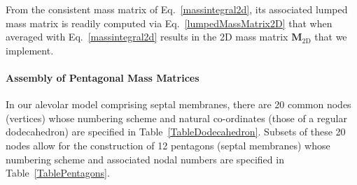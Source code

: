 From the consistent mass matrix of Eq.~\ref{massintegral2d}, its associated lumped mass matrix is readily computed via Eq.~\ref{lumpedMassMatrix2D} that when averaged with Eq.~\ref{massintegral2d} results in the 2D mass matrix $\mathbf{M}_{\mathrm{2D}}$ that we implement.

\paragraph{Assembly of Pentagonal Mass Matrices}

In our alevolar model comprising septal membranes, there are 20 common nodes (vertices) whose numbering scheme and natural co-ordinates (those of a regular dodecahedron) are specified in Table~\ref{TableDodecahedron}.  Subsets of these 20 nodes allow for the construction of 12 pentagons (septal membranes) whose numbering scheme and associated nodal numbers are specified in Table~\ref{TablePentagons}.

